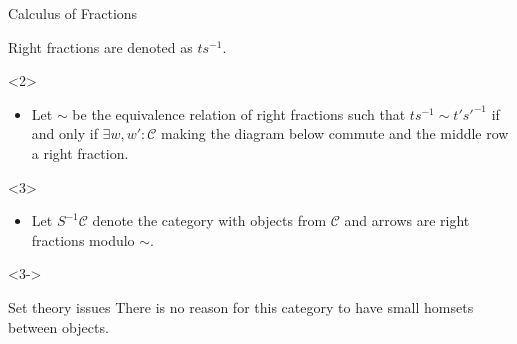 \documentclass{beamer}
\begin{document}
\begin{frame}{Calculus of Fractions}
\begin{onlyenv}
\begin{definition}
\begin{center}
\begin{tikzcd}[ampersand replacement=\&]
                            \end{tikzcd}
                        \end{center}
                        Right fractions are denoted as $ts^{-1}$. \\
                        \begin{onlyenv}<2>
                            \begin{itemize}
                                \item Let $\sim$ be the equivalence relation of right fractions such that $ts^{-1}\sim t's'^{-1}$ if and only if $\exists w,w':\mathcal{C}$ making the diagram below commute and the middle row a right fraction.
                            \end{itemize}
                            \begin{center}
                            \end{center}
                        \end{onlyenv}
                        \begin{onlyenv}<3>
                            \begin{itemize}
                                \item Let $S^{-1}\mathcal{C}$ denote the category with objects from $\mathcal{C}$ and arrows are right fractions modulo $\sim$.
                            \end{itemize}
                        \end{onlyenv}
                    \end{definition}
                    \begin{onlyenv}<3->
                        \begin{alertblock}{Set theory issues}
                            There is no reason for this category to have small homsets between objects.
                        \end{alertblock}
                    \end{onlyenv}
                \end{onlyenv}
            \end{frame}
\end{document}
